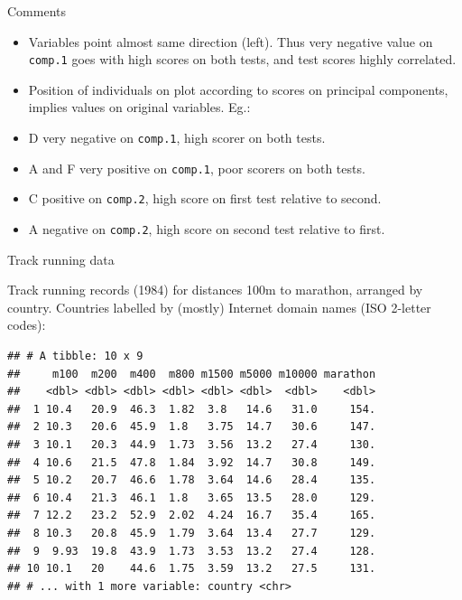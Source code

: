 \documentclass[
  ignorenonframetext,
]{beamer}
\newenvironment{Shaded}{\begin{snugshade}}{\end{snugshade}}
\newcommand{\DecValTok}[1]{\textcolor[rgb]{0.00,0.00,0.81}{#1}}
\newcommand{\KeywordTok}[1]{\textcolor[rgb]{0.13,0.29,0.53}{\textbf{#1}}}
\newcommand{\NormalTok}[1]{#1}
\newcommand{\OperatorTok}[1]{\textcolor[rgb]{0.81,0.36,0.00}{\textbf{#1}}}
\newcommand{\StringTok}[1]{\textcolor[rgb]{0.31,0.60,0.02}{#1}}
\begin{document}
\begin{frame}[fragile]{Comments}
\protect\hypertarget{comments-31}{}

\begin{itemize}
\item
  Variables point almost same direction (left). Thus very negative value
  on \texttt{comp.1} goes with high scores on both tests, and test
  scores highly correlated.
\item
  Position of individuals on plot according to scores on principal
  components, implies values on original variables. Eg.:
\item
  D very negative on \texttt{comp.1}, high scorer on both tests.
\item
  A and F very positive on \texttt{comp.1}, poor scorers on both tests.
\item
  C positive on \texttt{comp.2}, high score on first test relative to
  second.
\item
  A negative on \texttt{comp.2}, high score on second test relative to
  first.
\end{itemize}

\end{frame}

\begin{frame}[fragile]{Track running data}
\protect\hypertarget{track-running-data}{}

Track running records (1984) for distances 100m to marathon, arranged by
country. Countries labelled by (mostly) Internet domain names (ISO
2-letter codes):

\scriptsize

\begin{Shaded}
\end{Shaded}

\begin{verbatim}
## # A tibble: 10 x 9
##     m100  m200  m400  m800 m1500 m5000 m10000 marathon
##    <dbl> <dbl> <dbl> <dbl> <dbl> <dbl>  <dbl>    <dbl>
##  1 10.4   20.9  46.3  1.82  3.8   14.6   31.0     154.
##  2 10.3   20.6  45.9  1.8   3.75  14.7   30.6     147.
##  3 10.1   20.3  44.9  1.73  3.56  13.2   27.4     130.
##  4 10.6   21.5  47.8  1.84  3.92  14.7   30.8     149.
##  5 10.2   20.7  46.6  1.78  3.64  14.6   28.4     135.
##  6 10.4   21.3  46.1  1.8   3.65  13.5   28.0     129.
##  7 12.2   23.2  52.9  2.02  4.24  16.7   35.4     165.
##  8 10.3   20.8  45.9  1.79  3.64  13.4   27.7     129.
##  9  9.93  19.8  43.9  1.73  3.53  13.2   27.4     128.
## 10 10.1   20    44.6  1.75  3.59  13.2   27.5     131.
## # ... with 1 more variable: country <chr>
\end{verbatim}

\normalsize

\end{frame}
\end{document}
